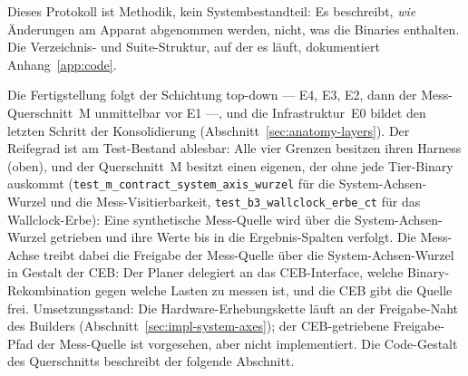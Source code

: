 \begin{nurlang}
Dieses Protokoll ist Methodik, kein Systembestandteil: Es beschreibt, \emph{wie} Änderungen am
Apparat abgenommen werden, nicht, was die Binaries enthalten. Die Verzeichnis- und Suite-Struktur,
auf der es läuft, dokumentiert Anhang~\ref{app:code}.

Die Fertigstellung folgt der Schichtung top-down --- E4, E3, E2, dann der Mess-Querschnitt~M
unmittelbar vor E1 ---, und die Infrastruktur~E0 bildet den letzten Schritt der Konsolidierung
(Abschnitt~\ref{sec:anatomy-layers}). Der Reifegrad ist am Test-Bestand ablesbar: Alle vier Grenzen besitzen
ihren Harness (oben), und der Querschnitt~M besitzt einen eigenen, der ohne jede Tier-Binary auskommt
(\texttt{test\_\allowbreak{}m\_\allowbreak{}contract\_\allowbreak{}system\_\allowbreak{}axis\_\allowbreak{}wurzel}
für die System-Achsen-Wurzel und die Mess-Visitierbarkeit,
\texttt{test\_\allowbreak{}b3\_\allowbreak{}wallclock\_\allowbreak{}erbe\_\allowbreak{}ct} für das
Wallclock-Erbe): Eine synthetische Mess-Quelle wird über die System-Achsen-Wurzel getrieben und ihre
Werte bis in die Ergebnis-Spalten verfolgt. Die Mess-Achse treibt dabei die Freigabe der Mess-Quelle über
die System-Achsen-Wurzel in Gestalt der CEB\@: Der Planer delegiert an das CEB-Interface, welche
Binary-Rekombination gegen welche Lasten zu messen ist, und die CEB gibt die Quelle frei.
Umsetzungsstand: Die Hardware-Erhebungskette läuft an der Freigabe-Naht des Builders
(Abschnitt~\ref{sec:impl-system-axes}); der CEB-getriebene Freigabe-Pfad der Mess-Quelle ist
vorgesehen, aber nicht implementiert. Die Code-Gestalt des Querschnitts beschreibt der folgende Abschnitt.
\end{nurlang}
